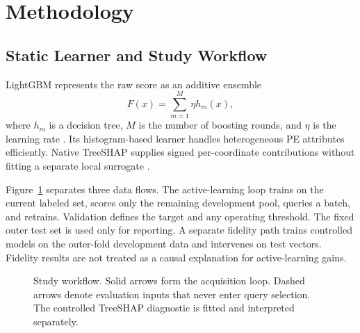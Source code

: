 \section{Methodology}
\label{sec:method}

\subsection{Static Learner and Study Workflow}

LightGBM represents the raw score as an additive ensemble
\begin{equation}
F(x)=\sum_{m=1}^{M}\eta h_m(x),
\end{equation}
where $h_m$ is a decision tree, $M$ is the number of boosting rounds, and $\eta$
is the learning rate \cite{ke2017lightgbm}. Its histogram-based learner handles
heterogeneous PE attributes efficiently. Native TreeSHAP supplies signed
per-coordinate contributions without fitting a separate local surrogate
\cite{lundberg2020local}.

Figure~\ref{fig:workflow} separates three data flows. The active-learning loop
trains on the current labeled set, scores only the remaining development pool,
queries a batch, and retrains. Validation defines the target and any operating
threshold. The fixed outer test set is used only for reporting. A separate
fidelity path trains controlled models on the outer-fold development data and
intervenes on test vectors. Fidelity results are not treated as a causal
explanation for active-learning gains.

\begin{figure}[t]
\centering
{}
\caption{Study workflow. Solid arrows form the acquisition loop. Dashed arrows
denote evaluation inputs that never enter query selection. The controlled
TreeSHAP diagnostic is fitted and interpreted separately.}
\label{fig:workflow}
\end{figure}

